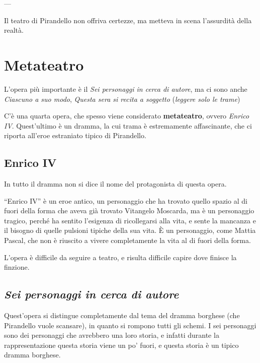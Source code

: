 ---

Il teatro di Pirandello non offriva certezze, ma metteva in scena l’assurdità della realtà.

\section{Metateatro}

L’opera più importante è il \textit{Sei personaggi in cerca di autore}, ma ci sono anche \textit{Ciascuno a suo modo}, \textit{Questa sera si recita a soggetto} (\emph{leggere solo le trame})

C’è una quarta opera, che spesso viene considerato \textbf{metateatro}, ovvero \textit{Enrico IV}.
Quest’ultimo è un dramma, la cui trama è estremamente affascinante, che ci riporta all’eroe estraniato tipico di Pirandello.

\subsection{Enrico IV}

In tutto il dramma non si dice il nome del protagonista di questa opera.


“Enrico IV” è un eroe antico, un personaggio che ha trovato quello spazio al di fuori della forma che aveva già trovato Vitangelo Moscarda, ma è un personaggio tragico, perché ha sentito l’esigenza di ricollegarsi alla vita, e sente la mancanza e il bisogno di quelle pulsioni tipiche della sua vita.
È un personaggio, come Mattia Pascal, che non è riuscito a vivere completamente la vita al di fuori della forma.

L’opera è difficile da seguire a teatro, e risulta difficile capire dove finisce la finzione.

\subsection{\textit{Sei personaggi in cerca di autore}}

Quest’opera si distingue completamente dal tema del dramma borghese (che Pirandello vuole scansare), in quanto si rompono tutti gli schemi.
I sei personaggi sono dei personaggi che avrebbero una loro storia, e infatti durante la rappresentazione questa storia viene un po’ fuori, e questa storia è un tipico dramma borghese.

